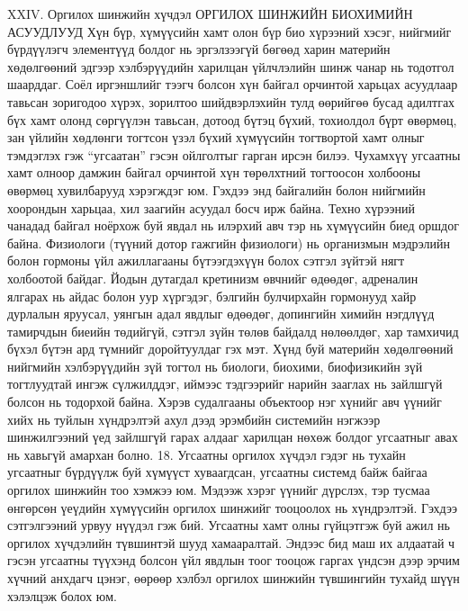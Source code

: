 XXIV. Оргилох шинжийн хүчдэл
ОРГИЛОХ ШИНЖИЙН БИОХИМИЙН АСУУДЛУУД
Хүн бүр, хүмүүсийн хамт олон бүр био хүрээний хэсэг, нийгмийг бүрдүүлэгч элементүүд болдог нь эргэлзээгүй бөгөөд харин материйн хөдөлгөөний эдгээр хэлбэрүүдийн харилцан үйлчлэлийн шинж чанар нь тодотгол шаарддаг. Соёл иргэншлийг тээгч болсон хүн байгал орчинтой харьцах асуудлаар тавьсан зоригодоо хүрэх, зорилтоо шийдвэрлэхийн тулд өөрийгөө бусад адилтгах бүх хамт олонд сөргүүлэн тавьсан, дотоод бүтэц бүхий, тохиолдол бүрт өвөрмөц, зан үйлийн хөдлөнги тогтсон үзэл бүхий хүмүүсийн тогтвортой хамт олныг тэмдэглэх гэж “угсаатан” гэсэн ойлголтыг гарган ирсэн билээ. Чухамхүү угсаатны хамт олноор дамжин байгал орчинтой хүн төрөлхтний тогтоосон холбооны өвөрмөц хувилбарууд хэрэгждэг юм. Гэхдээ энд байгалийн болон нийгмийн хоорондын харьцаа, хил заагийн асуудал босч ирж байна. Техно хүрээний чанадад байгал ноёрхож буй явдал нь илэрхий авч тэр нь хүмүүсийн биед оршдог байна. Физиологи (түүний дотор гажгийн физиологи) нь организмын мэдрэлийн болон гормоны үйл ажиллагааны бүтээгдэхүүн болох сэтгэл зүйтэй нягт холбоотой байдаг. Йодын дутагдал кретинизм өвчнийг өдөөдөг, адреналин ялгарах нь айдас болон уур хүргэдэг, бэлгийн булчирхайн гормонууд хайр дурлалын яруусал, уянгын адал явдлыг өдөөдөг, допингийн химийн нэгдлүүд тамирчдын биеийн төдийгүй, сэтгэл зүйн төлөв байдалд нөлөөлдөг, хар тамхичид бүхэл бүтэн ард түмнийг доройтуулдаг гэх мэт. Хүнд буй материйн хөдөлгөөний нийгмийн хэлбэрүүдийн зүй тогтол нь биологи, биохими, биофизикийн зүй тогтлуудтай ингэж сүлжилддэг, иймээс тэдгээрийг нарийн зааглах нь зайлшгүй болсон нь тодорхой байна.
Хэрэв судалгааны объектоор нэг хүнийг авч үүнийг хийх нь туйлын хүндрэлтэй ахул дээд эрэмбийн системийн нэгжээр шинжилгээний үед зайлшгүй гарах алдааг харилцан нөхөж болдог угсаатныг авах нь хавьгүй амархан болно. 18. Угсаатны оргилох хүчдэл гэдэг нь тухайн угсаатныг бүрдүүлж буй хүмүүст хуваагдсан, угсаатны системд байж байгаа оргилох шинжийн тоо хэмжээ юм.
Мэдээж хэрэг үүнийг дүрслэх, тэр тусмаа өнгөрсөн үеүдийн хүмүүсийн оргилох шинжийг тооцоолох нь хүндрэлтэй. Гэхдээ сэтгэлгээний урвуу нүүдэл гэж бий. Угсаатны хамт олны гүйцэтгэж буй ажил нь оргилох хүчдэлийн түвшинтэй шууд хамааралтай. Эндээс бид маш их алдаатай ч гэсэн угсаатны түүхэнд болсон үйл явдлын тоог тооцож гаргах үндсэн дээр эрчим хүчний анхдагч цэнэг, өөрөөр хэлбэл оргилох шинжийн түвшингийн тухайд шүүн хэлэлцэж болох юм.
